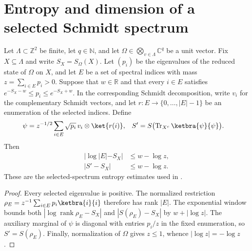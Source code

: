 \section{Entropy and dimension of a selected Schmidt spectrum}

\begin{lemma}
    \label{thm:area_law_selected_schmidt_entropy_bounds}
    \leanok
    Let $\Lambda\subset\mathbb Z^2$ be finite, let $q\in\mathbb N$, and let
    $\Omega\in\bigotimes_{v\in\Lambda}\mathbb C^q$ be a unit vector.
    Fix $X\subseteq\Lambda$ and write $S_X=S_{\Omega}(X)$.
    Let $(p_i)$ be the eigenvalues of the reduced state of $\Omega$ on $X$,
    and let $E$ be a set of spectral indices with mass $z=\sum_{i\in E}p_i>0$.
    Suppose that $w\in\mathbb R$ and that every $i\in E$ satisfies
    $e^{-S_X-w}\le p_i\le e^{-S_X+w}$.
    In the corresponding Schmidt decomposition, write $v_i$ for the
    complementary Schmidt vectors, and let $r:E\to\{0,\ldots,|E|-1\}$ be
    an enumeration of the selected indices. Define
    \begin{align*}
        \psi & =z^{-1/2}\sum_{i\in E}\sqrt{p_i}\,v_i\otimes\ket{r(i)}, & S' & =S\bigl(\operatorname{Tr}_{X^c}\ketbra{\psi}{\psi}\bigr).
    \end{align*}
    Then
    \begin{align*}
        |\log|E|-S_X| & \le w-\log z, \\
        |S'-S_X|      & \le w-\log z.
    \end{align*}
    These are the selected-spectrum entropy estimates used in
    \cite[Section~8]{OpenAI2026AreaLaw}.
\end{lemma}
\begin{proof}
    \leanok
    Every selected eigenvalue is positive. The normalized restriction
    $\rho_E=z^{-1}\sum_{i\in E}p_i\ketbra{i}{i}$ therefore has rank $|E|$.
    The exponential window bounds both
    $|\log\operatorname{rank}\rho_E-S_X|$ and $|S(\rho_E)-S_X|$ by
    $w+|\log z|$. The auxiliary marginal of $\psi$ is diagonal with entries
    $p_i/z$ in the fixed enumeration, so $S'=S(\rho_E)$.
    Finally, normalization of $\Omega$ gives $z\le1$, whence
    $|\log z|=-\log z$.
\end{proof}
